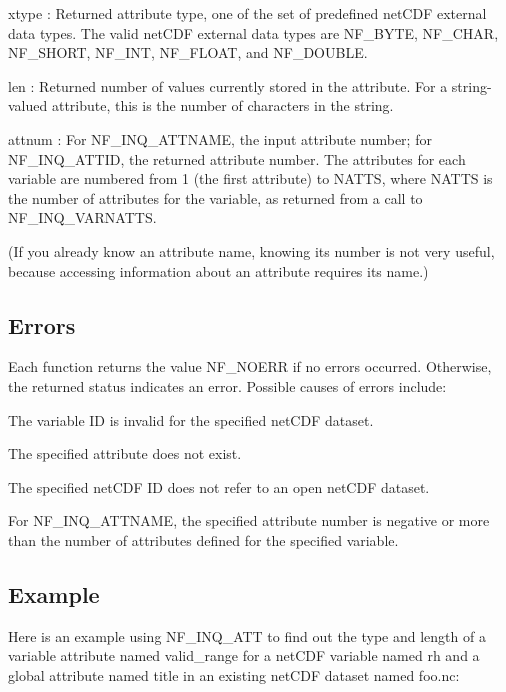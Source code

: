 {\ttfamily xtype} \+: Returned attribute type, one of the set of predefined net\+C\+DF external data types. The valid net\+C\+DF external data types are N\+F\+\_\+\+B\+Y\+TE, N\+F\+\_\+\+C\+H\+AR, N\+F\+\_\+\+S\+H\+O\+RT, N\+F\+\_\+\+I\+NT, N\+F\+\_\+\+F\+L\+O\+AT, and N\+F\+\_\+\+D\+O\+U\+B\+LE.

{\ttfamily len} \+: Returned number of values currently stored in the attribute. For a string-\/valued attribute, this is the number of characters in the string.

{\ttfamily attnum} \+: For N\+F\+\_\+\+I\+N\+Q\+\_\+\+A\+T\+T\+N\+A\+ME, the input attribute number; for N\+F\+\_\+\+I\+N\+Q\+\_\+\+A\+T\+T\+ID, the returned attribute number. The attributes for each variable are numbered from 1 (the first attribute) to N\+A\+T\+TS, where N\+A\+T\+TS is the number of attributes for the variable, as returned from a call to N\+F\+\_\+\+I\+N\+Q\+\_\+\+V\+A\+R\+N\+A\+T\+TS.

(If you already know an attribute name, knowing its number is not very useful, because accessing information about an attribute requires its name.)

\subsection*{Errors }

Each function returns the value N\+F\+\_\+\+N\+O\+E\+RR if no errors occurred. Otherwise, the returned status indicates an error. Possible causes of errors include\+:


\begin{DoxyItemize}
\item The variable ID is invalid for the specified net\+C\+DF dataset.
\item The specified attribute does not exist.
\item The specified net\+C\+DF ID does not refer to an open net\+C\+DF dataset.
\item For N\+F\+\_\+\+I\+N\+Q\+\_\+\+A\+T\+T\+N\+A\+ME, the specified attribute number is negative or more than the number of attributes defined for the specified variable.
\end{DoxyItemize}

\subsection*{Example }

Here is an example using N\+F\+\_\+\+I\+N\+Q\+\_\+\+A\+TT to find out the type and length of a variable attribute named valid\+\_\+range for a net\+C\+DF variable named rh and a global attribute named title in an existing net\+C\+DF dataset named foo.\+nc\+:


